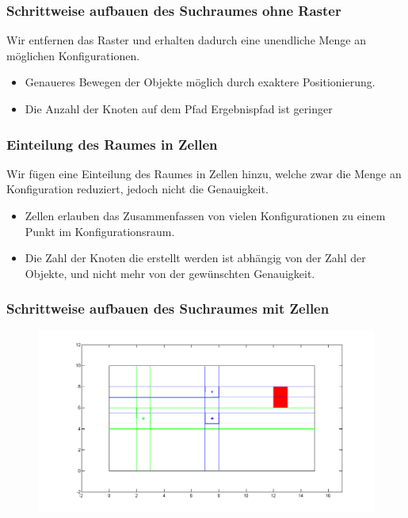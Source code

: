 \documentclass[final]{beamer}
\begin{document}


\begin{frame}
\frametitle{Schrittweise aufbauen des Suchraumes ohne Raster}
Wir entfernen das Raster und erhalten dadurch eine unendliche Menge an möglichen Konfigurationen.
\begin{itemize}
\item Genaueres Bewegen der Objekte möglich durch exaktere Positionierung.
\item Die Anzahl der Knoten auf dem Pfad Ergebnispfad ist geringer 
\end{itemize}
\end{frame}
%


\begin{frame}
\frametitle{Einteilung des Raumes in Zellen}
Wir fügen eine Einteilung des Raumes in Zellen hinzu, welche zwar die Menge an Konfiguration reduziert, jedoch nicht die Genauigkeit.
\begin{itemize}
\item Zellen erlauben das Zusammenfassen von vielen Konfigurationen zu einem Punkt im Konfigurationsraum.
\item Die Zahl der Knoten die erstellt werden ist abhängig von der Zahl der Objekte, und nicht mehr von der gewünschten Genauigkeit.
\end{itemize}
\end{frame}

\begin{frame}
\frametitle{Schrittweise aufbauen des Suchraumes mit Zellen}
\begin{figure}
\centering
\includegraphics[scale=0.3]{../thesis/cellRiddle}
\end{figure}
\end{frame}
\end{document}
